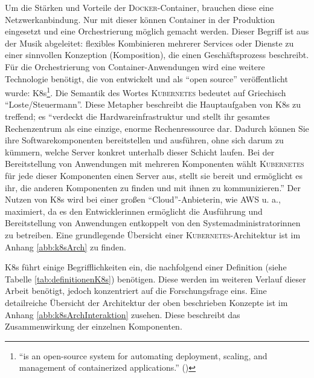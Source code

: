 Um die Stärken und Vorteile der \textsc{Docker}-Container, brauchen diese eine Netzwerkanbindung. Nur mit dieser können Container in der Produktion eingesetzt und eine Orchestrierung möglich gemacht werden. Dieser Begriff ist aus der Musik abgeleitet: flexibles Kombinieren mehrerer Services oder Dienste zu einer sinnvollen Konzeption (Komposition), die einen Geschäftsprozess beschreibt. Für die Orchestrierung von Container-Anwendungen wird eine weitere Technologie benötigt, die von \cite{google_llc_production-grade_2020} entwickelt und als \enquote{open source} veröffentlicht wurde: \ac{K8s}\footnote{\enquote{is an open-source system for automating deployment, scaling, and management of containerized applications.} (\cite{google_llc_production-grade_2020})}. Die Semantik des Wortes \textsc{Kubernetes} bedeutet auf Griechisch \enquote{Loste/Steuermann}. Diese Metapher beschreibt die Hauptaufgaben von \ac{K8s} zu treffend; es \enquote{verdeckt die Hardwareinfrastruktur und stellt ihr gesamtes Rechenzentrum als eine einzige, enorme Rechenressource dar. Dadurch können Sie ihre Softwarekomponenten	bereitstellen und ausführen, ohne sich darum zu kümmern, welche Server konkret unterhalb dieser Schicht laufen. Bei der Bereitstellung von Anwendungen mit mehreren Komponenten wählt \textsc{Kubernetes} für jede dieser Komponenten einen Server aus, stellt sie bereit und ermöglicht es ihr, die anderen Komponenten zu finden und mit ihnen zu kommunizieren.}\autocite[][S.\,4]{luksa_kubernetes_2018} Der Nutzen von \ac{K8s} wird bei einer großen \enquote{Cloud}-Anbieterin, wie \ac{AWS} u. a., maximiert, da es den Entwicklerinnen ermöglicht die Ausführung und Bereitstellung von Anwendungen entkoppelt von den Systemadministratorinnen zu betreiben.\autocite[vgl.][S.\,4]{luksa_kubernetes_2018} Eine grundlegende Übersicht einer \textsc{Kubernetes}-Architektur ist im Anhang \vref{abb:k8sArch} zu finden.
\par
\ac{K8s} führt einige Begrifflichkeiten ein, die nachfolgend einer Definition\autocite[][S.\,10-14]{caban_architecting_2019} (siehe Tabelle \ref{tab:definitionenK8s}) benötigen. Diese werden im weiteren Verlauf dieser Arbeit benötigt, jedoch konzentriert auf die Forschungsfrage eins. Eine detailreiche Übersicht der Architektur der oben beschrieben Konzepte ist im Anhang \vref{abb:k8sArchInteraktion} zusehen. Diese beschreibt das Zusammenwirkung der einzelnen Komponenten.
\par

